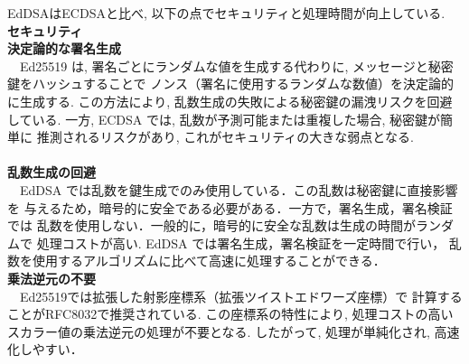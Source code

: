 EdDSAはECDSAと比べ, 以下の点でセキュリティと処理時間が向上している.\\[1em]
{\large\textbf{セキュリティ}}\\[1em]
\noindent\textbf{決定論的な署名生成}\\
　Ed25519 は, 署名ごとにランダムな値を生成する代わりに, 
メッセージと秘密鍵をハッシュすることで 
ノンス（署名に使用するランダムな数値）を決定論的に生成する.
この方法により, 乱数生成の失敗による秘密鍵の漏洩リスクを回避している.
一方, ECDSA では, 乱数が予測可能または重複した場合, 秘密鍵が簡単に
推測されるリスクがあり, これがセキュリティの大きな弱点となる.\\[1em]
\\[1em]
\noindent\textbf{乱数生成の回避} \leavevmode\\
　EdDSA では乱数を鍵生成でのみ使用している．この乱数は秘密鍵に直接影響を
与えるため，暗号的に安全である必要がある．一方で，署名生成，署名検証では
乱数を使用しない．一般的に，暗号的に安全な乱数は生成の時間がランダムで
処理コストが高い. EdDSA では署名生成，署名検証を一定時間で行い，
乱数を使用するアルゴリズムに比べて高速に処理することができる．\\

\noindent\textbf{乗法逆元の不要} \leavevmode\\
　Ed25519では拡張した射影座標系（拡張ツイストエドワーズ座標）で
計算することがRFC8032で推奨されている.
この座標系の特性により, 処理コストの高いスカラー値の乗法逆元の処理が不要となる. 
したがって, 処理が単純化され,  高速化しやすい．

